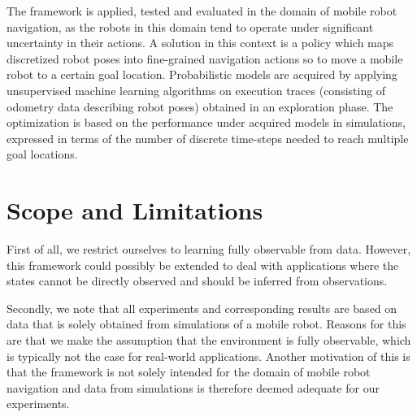 The framework is applied, tested and evaluated in the domain of mobile robot navigation, as the robots in this domain tend to operate under significant uncertainty in their actions.
A solution in this context is a policy which maps discretized robot poses into fine-grained navigation actions so to move a mobile robot to a certain goal location.
Probabilistic models are acquired by applying unsupervised machine learning algorithms on execution traces (consisting of odometry data describing robot poses) obtained in an exploration phase.
The optimization is based on the performance under acquired models in simulations, expressed in terms of the number of discrete time-steps needed to reach multiple goal locations.



\section{Scope and Limitations}
\label{sec:scope-limitations}

First of all, we restrict ourselves to learning fully observable  from data.
However, this framework could possibly be extended to deal with applications where the states cannot be directly observed and should be inferred from observations.

Secondly, we note that all experiments and corresponding results are based on data that is solely obtained from simulations of a mobile robot.
Reasons for this are that we make the assumption that the environment is fully observable, which is typically not the case for real-world applications.
Another motivation of this is that the framework is not solely intended for the domain of mobile robot navigation and data from simulations is therefore deemed adequate for our experiments. %

